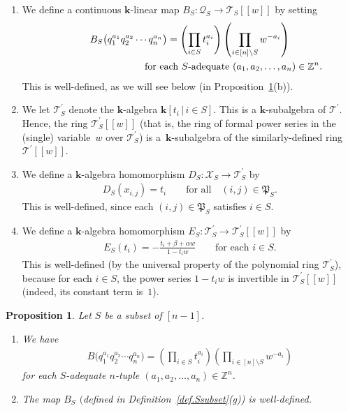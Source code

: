 \documentclass[pdftex]{sigma}
\newtheorem{Proposition}[Theorem]{Proposition}
\numberwithin{equation}{section}
\let\prodnonlimits\prod
\renewcommand{\prod}{\prodnonlimits\limits}
\begin{document}
\begin{Definition}
\begin{enumerate}
\item[(g)] We define a continuous $\mathbf{k}$-linear map $B_{S}\colon \mathcal{Q}_{S}\rightarrow\mathcal{T}_{S}[[w]] $ by setting
\begin{gather*}
B_{S}\big( q_{1}^{a_{1}}q_{2}^{a_{2}}\cdots q_{n}^{a_{n}}\big) =\left( \prod_{i\in S}t_{i}^{a_{i}}\right) \left( \prod_{i\in[n] \setminus S}w^{-a_{i}}\right) \\
\hphantom{B_{S}\big( q_{1}^{a_{1}}q_{2}^{a_{2}}\cdots q_{n}^{a_{n}}\big) =}{} \text{for each }S\text{-adequate } ( a_{1},a_{2},\ldots,a_{n}) \in\mathbb{Z}^{n}.
\end{gather*}
This is well-defined, as we will see below (in Proposition~\ref{prop.pathless.BSwd}(b)).
\item[(h)] We let $\mathcal{T}_{S}^{\prime}$ denote the $\mathbf{k}$-algebra $\mathbf{k} [ t_{i}\,|\, i\in S ] $. This is a $\mathbf{k}$-subalgebra of $\mathcal{T}^{\prime}$. Hence, the ring $\mathcal{T}_{S}^{\prime}[[w]] $ (that is, the ring of formal power series in the (single) variable~$w$ over $\mathcal{T}_{S}^{\prime}$) is a~$\mathbf{k}$-subalgebra of the similarly-defined ring~$\mathcal{T}^{\prime}[[w]] $.
\item[(i)] We define a $\mathbf{k}$-algebra homomorphism $D_{S}\colon \mathcal{X}_{S}\rightarrow\mathcal{T}_{S}^{\prime}$ by
\begin{gather*}
D_{S}(x_{i,j}) =t_{i}\qquad \text{for all} \quad (i,j) \in\mathfrak{P}_{S}.
\end{gather*}
This is well-defined, since each $(i,j) \in\mathfrak{P}_{S}$ satisfies $i\in S$.
\item[(j)] We define a $\mathbf{k}$-algebra homomorphism $E_{S}\colon \mathcal{T}_{S}^{\prime}\rightarrow\mathcal{T}_{S}^{\prime} [ [w]] $ by
\begin{gather*}
E_{S}(t_{i}) =-\frac{t_{i}+\beta+\alpha w}{1-t_{i}w}\qquad \text{for each }i\in S.
\end{gather*}
This is well-defined (by the universal property of the polynomial ring $\mathcal{T}_{S}^{\prime}$), because for each $i\in S$, the power series $1-t_{i}w$ is invertible in $\mathcal{T}_{S}^{\prime} [ [w]] $ (indeed, its constant term is~$1$).
\end{enumerate}
\end{Definition}

\begin{Proposition}\label{prop.pathless.BSwd}Let $S$ be a subset of $[n-1] $.
\begin{enumerate}\itemsep=0pt
\item[{\rm (a)}] We have
\begin{gather}
B\big( q_{1}^{a_{1}}q_{2}^{a_{2}}\cdots q_{n}^{a_{n}}\big) =\left(\prod_{i\in S}t_{i}^{a_{i}}\right) \left( \prod_{i\in[n]\setminus S}w^{-a_{i}}\right) \label{eq.prop.pathless.BSwd.a.eq}
\end{gather}
for each $S$-adequate $n$-tuple $ ( a_{1},a_{2},\ldots,a_{n} ) \in\mathbb{Z}^{n}$.

\item[{\rm (b)}] The map $B_{S}$ $($defined in Definition~{\rm \ref{def.Ssubset}(g))} is well-defined.
\end{enumerate}
\end{Proposition}
\end{document}
